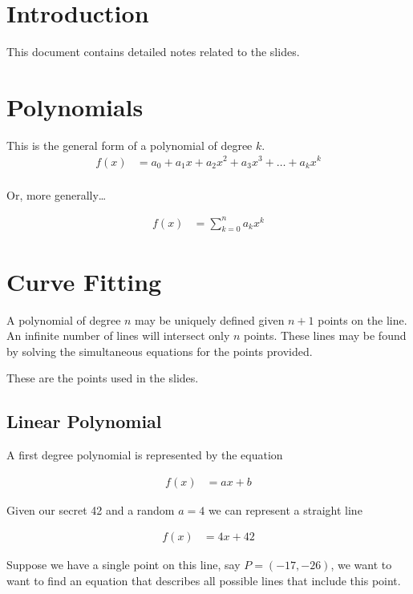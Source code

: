\documentclass[preview,border=3mm]{article}
\begin{document}
\section{Introduction}
This document contains detailed notes related to the slides.


\section{Polynomials}
\noindent
This is the general form of a polynomial of degree $k$.
\begin{align*}
    f(x) &= a_0 + a_1x + a_2x^2 + a_3x^3 + \ldots + a_kx^k\\
\end{align*}

\noindent
Or, more generally\dots

\begin{align*}
    f(x) &= \sum\limits_{k=0}^n a_kx^k
\end{align*}


\section{Curve Fitting}
\noindent
A polynomial of degree $n$ may be uniquely defined given $n+1$ points on the
line. An infinite number of lines will intersect only $n$ points. These lines
may be found by solving the simultaneous equations for the points provided.

\noindent
These are the points used in the slides.

\subsection{Linear Polynomial}

\noindent
A first degree polynomial is represented by the equation

\begin{align*}
    f(x) &= ax + b
\end{align*}

\noindent
Given our secret 42 and a random $a = 4$ we can represent a straight line

\begin{align}
    f(x) &= 4x + 42 \label{eq1}
\end{align}

\noindent
Suppose we have a single point on this line, say $P = (-17, -26)$, we want to
want to find an equation that describes all possible lines that include this
point.
\end{document}
